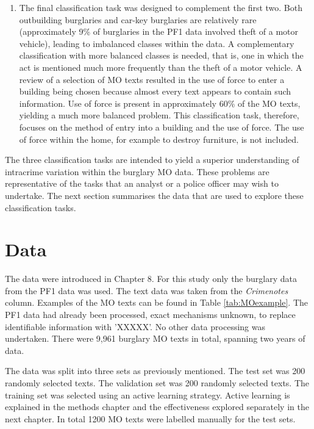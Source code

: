 \begin{enumerate}
 \item The final classification task was designed to complement the first two. Both outbuilding burglaries and car-key burglaries are relatively rare (approximately 9\% of burglaries in the PF1 data involved theft of a motor vehicle), leading to imbalanced classes within the data. A complementary classification with more balanced classes is needed, that is, one in which the act is mentioned much more frequently than the theft of a motor vehicle. A review of a selection of MO texts resulted in the use of force to enter a building being chosen because almost every text appears to contain such information. Use of force is present in approximately 60\% of the MO texts, yielding a much more balanced problem. This classification task, therefore, focuses on the method of entry into a building and the use of force. The use of force within the home, for example to destroy furniture, is not included.

\end{enumerate}


The three classification tasks are intended to yield a superior understanding of intracrime variation within the burglary MO data. These problems are representative of the tasks that an analyst or a police officer may wish to undertake. The next section summarises the data that are used to explore these classification tasks.


\section{Data} The data were introduced in Chapter 8. For this study only the burglary data from the PF1 data was used. The text data was taken from the \emph{Crimenotes} column. Examples of the MO texts can be found in Table \ref{tab:MOexample}. The PF1 data had already been processed, exact mechanisms unknown, to replace identifiable information with 'XXXXX'. No other data processing was undertaken. There were 9,961 burglary MO texts in total, spanning two years of data.

The data was split into three sets as previously mentioned. The test set was 200 randomly selected texts. The validation set was 200 randomly selected texts. The training set was selected using an active learning strategy. Active learning is explained in the methods chapter and the effectiveness explored separately in the next chapter. In total 1200 MO texts were labelled manually  for the test sets. 


